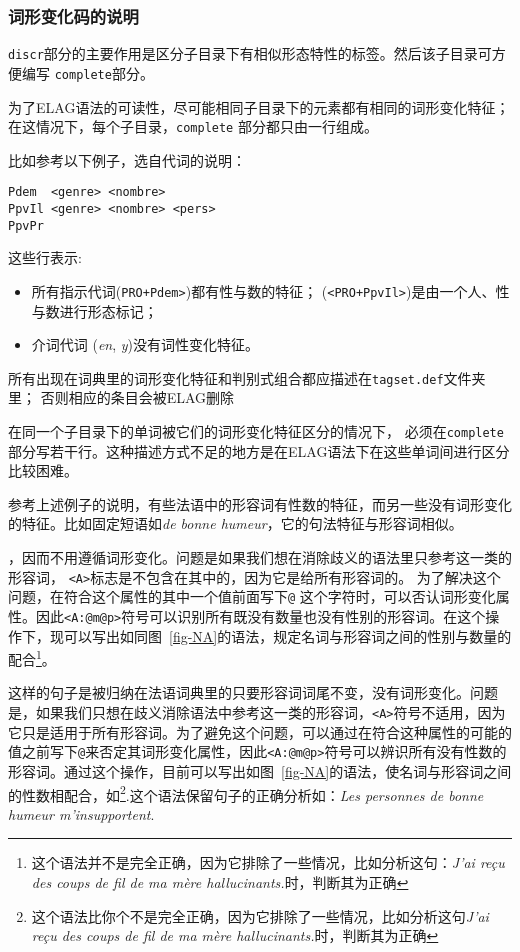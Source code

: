 \subsubsection{词形变化码的说明}
\verb$discr$部分的主要作用是区分子目录下有相似形态特性的标签。然后该子目录可方便编写 \verb$complete$部分。


\bigskip
\noindent
为了ELAG语法的可读性，尽可能相同子目录下的元素都有相同的词形变化特征；在这情况下，每个子目录，\verb$complete$ 部分都只由一行组成。

比如参考以下例子，选自代词的说明：
\begin{verbatim}
Pdem  <genre> <nombre>
PpvIl <genre> <nombre> <pers>
PpvPr
\end{verbatim}



\bigskip
\noindent 这些行表示:
\begin{itemize}
  \item 所有指示代词(\verb$PRO+Pdem>$)都有性与数的特征；
   (\verb$<PRO+PpvIl>$)是由一个人、性与数进行形态标记；
  \item 介词代词 (\textit{en}, \textit{y})没有词性变化特征。
\end{itemize}

\bigskip
\noindent 
所有出现在词典里的词形变化特征和判别式组合都应描述在\verb$tagset.def$文件夹里； 否则相应的条目会被ELAG删除


\bigskip
\noindent
在同一个子目录下的单词被它们的词形变化特征区分的情况下， 必须在\verb$complete$部分写若干行。这种描述方式不足的地方是在ELAG语法下在这些单词间进行区分比较困难。

\bigskip
\noindent 参考上述例子的说明，有些法语中的形容词有性数的特征，而另一些没有词形变化的特征。比如固定短语如\textit{de bonne humeur}，它的句法特征与形容词相似。


，因而不用遵循词形变化。问题是如果我们想在消除歧义的语法里只参考这一类的形容词， \verb$<A>$标志是不包含在其中的，因为它是给所有形容词的。
为了解决这个问题，在符合这个属性的其中一个值前面写下\verb$@$ 这个字符时，可以否认词形变化属性。因此\verb$<A:@m@p>$符号可以识别所有既没有数量也没有性别的形容词。在这个操作下，现可以写出如同图~\ref{fig-NA}的语法，规定名词与形容词之间的性别与数量的配合\footnote{   这个语法并不是完全正确，因为它排除了一些情况，比如分析这句：\textit{J'ai re\c{c}u des coups de fil de ma m\`ere hallucinants.}时，判断其为正确}。

这样的句子是被归纳在法语词典里的只要形容词词尾不变，没有词形变化。问题是，如果我们只想在歧义消除语法中参考这一类的形容词，\verb$<A>$符号不适用，因为它只是适用于所有形容词。为了避免这个问题，可以通过在符合这种属性的可能的值之前写下\verb$@$来否定其词形变化属性，因此\verb$<A:@m@p>$符号可以辨识所有没有性数的形容词。通过这个操作，目前可以写出如图~\ref{fig-NA}的语法，使名词与形容词之间的性数相配合，如\footnote{这个语法比你个不是完全正确，因为它排除了一些情况，比如分析这句\textit{J'ai re\c{c}u des coups de fil de ma m\`ere hallucinants.}时，判断其为正确 }.这个语法保留句子的正确分析如：\textit{Les
personnes de bonne humeur m'insupportent}.





